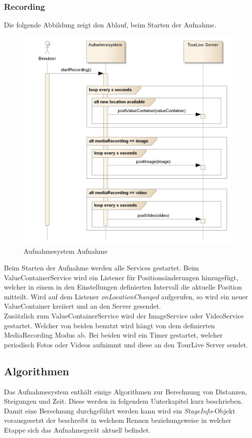 \pagebreak
\subsubsection{Recording}
Die folgende Abbildung zeigt den Ablauf, beim Starten der Aufnahme.
\begin{figure}[H]
	\centering
	\includegraphics[width=150mm]{images/android/recording.jpg}
	\caption{Aufnahmesystem Aufnahme}
\end{figure}

Beim Starten der Aufnahme werden alle Services gestartet. Beim ValueContainerService wird ein Listener für Positionsänderungen hinzugefügt, welcher in einem in den Einstellungen definierten Intervall die aktuelle Position mitteilt. Wird auf dem Listener \textit{onLocationChanged} aufgerufen, so wird ein neuer ValueContainer kreiiert und an den Server gesendet.\\
Zusätzlich zum ValueContainerService wird der ImageService oder VideoService gestartet. Welcher von beiden benutzt wird hängt von dem definierten MediaRecording Modus ab. Bei beiden wird ein Timer gestartet, welcher periodisch Fotos oder Videos aufnimmt und diese an den TourLive Server sendet.

\subsection{Algorithmen}
Das Aufnahmesystem enthält einige Algorithmen zur Berechnung von Distanzen, Steigungen und Zeit. Diese werden in folgendem Unterkapitel kurz beschrieben. Damit eine Berechnung durchgeführt werden kann wird ein \textit{StageInfo}-Objekt vorausgesetzt der beschreibt in welchem Rennen beziehungsweise in welcher Etappe sich das Aufnahmegerät aktuell befindet.
\\

